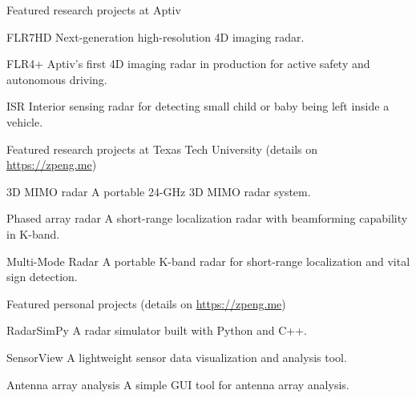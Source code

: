 
Featured research projects at Aptiv

\begin{cvskills}
    \cvskill
        {FLR7HD}
        {Next-generation high-resolution 4D imaging radar.}

    \cvskill
        {FLR4+}
        {Aptiv’s first 4D imaging radar in production for active safety and autonomous driving.}

    \cvskill
        {ISR}
        {Interior sensing radar for detecting small child or baby being left inside a vehicle.}

\end{cvskills}

Featured research projects at Texas Tech University (details on \href{https://zpeng.me}{https://zpeng.me})

\begin{cvskills}
    \cvskill
        {3D MIMO radar}
        {A portable 24-GHz 3D MIMO radar system.}

    \cvskill
        {Phased array radar}
        {A short-range localization radar with beamforming capability in K-band.}

    \cvskill
        {Multi-Mode Radar}
        {A portable K-band radar for short-range localization and vital sign detection.}

\end{cvskills}

Featured personal projects (details on \href{https://zpeng.me}{https://zpeng.me})

\begin{cvskills}

    \cvskill
        {RadarSimPy}
        {A radar simulator built with Python and C++.}

    \cvskill
        {SensorView}
        {A lightweight sensor data visualization and analysis tool.}

    \cvskill
        {Antenna array analysis}
        {A simple GUI tool for antenna array analysis.}



\end{cvskills}
